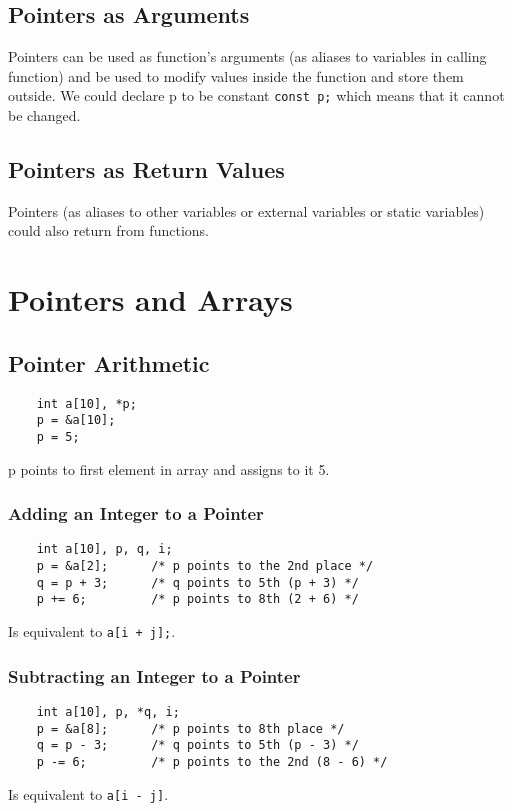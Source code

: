 \documentclass[openany]{book}
\begin{document}
    \section{Pointers as Arguments}
    Pointers can be used as function's arguments (as aliases to variables in calling function) and be used to modify values inside the function and store them outside. We could declare p to be constant \texttt{const p;} which means that it cannot be changed.

    \section{Pointers as Return Values}
    Pointers (as aliases to other variables or external variables or static variables) could also return from functions. 



    \chapter{Pointers and Arrays}

    \section{Pointer Arithmetic}
    \begin{lstlisting}
    int a[10], *p;
    p = &a[10];
    p = 5;
    \end{lstlisting}
    p points to first element in array and assigns to it 5.

    \subsection*{Adding an Integer to a Pointer}
    \begin{lstlisting}
    int a[10], p, q, i;
    p = &a[2];      /* p points to the 2nd place */
    q = p + 3;      /* q points to 5th (p + 3) */
    p += 6;         /* p points to 8th (2 + 6) */
    \end{lstlisting}
    Is equivalent to \texttt{a[i + j];}.

    \subsection*{Subtracting an Integer to a Pointer}
    \begin{lstlisting}
    int a[10], p, *q, i;
    p = &a[8];      /* p points to 8th place */
    q = p - 3;      /* q points to 5th (p - 3) */
    p -= 6;         /* p points to the 2nd (8 - 6) */
    \end{lstlisting}
    Is equivalent to \texttt{a[i - j]}.
\end{document}
